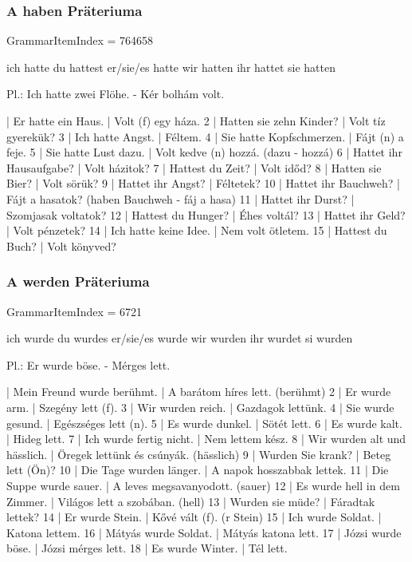 \documentclass{article}
\newenvironment{desc}{\verbatim}{\endverbatim}
\newenvironment{exmp}{\verbatim}{\endverbatim}
\begin{document}
\subsubsection{A haben Präteriuma}

GrammarItemIndex = 764658

\begin{desc}
ich hatte
du hattest
er/sie/es hatte
wir hatten
ihr hattet
sie hatten

Pl.: Ich hatte zwei Flöhe. - Kér bolhám volt.
\end{desc}

\begin{exmp}
1 | Er hatte ein Haus. | Volt (f) egy háza.
2 | Hatten sie zehn Kinder? | Volt tíz gyerekük?
3 | Ich hatte Angst. | Féltem.
4 | Sie hatte Kopfschmerzen. | Fájt (n) a feje.
5 | Sie hatte Lust dazu. | Volt kedve (n) hozzá. (dazu - hozzá)
6 | Hattet ihr Hausaufgabe? | Volt házitok?
7 | Hattest du Zeit? | Volt időd?
8 | Hatten sie Bier? | Volt sörük?
9 | Hattet ihr Angst? | Féltetek?
10 | Hattet ihr Bauchweh? | Fájt a hasatok? (haben Bauchweh - fáj a hasa)
11 | Hattet ihr Durst? | Szomjasak voltatok?
12 | Hattest du Hunger? | Éhes voltál?
13 | Hattet ihr Geld? | Volt pénzetek?
14 | Ich hatte keine Idee. | Nem volt ötletem.
15 | Hattest du Buch? | Volt könyved?
\end{exmp}

\subsubsection{A werden Präteriuma}

GrammarItemIndex = 6721

\begin{desc}
ich wurde
du wurdes
er/sie/es wurde
wir wurden
ihr wurdet
si wurden

Pl.: Er wurde böse. - Mérges lett.
\end{desc}

\begin{exmp}
1 | Mein Freund wurde berühmt. | A barátom híres lett. (berühmt)
2 | Er wurde arm. | Szegény lett (f).
3 | Wir wurden reich. | Gazdagok lettünk.
4 | Sie wurde gesund. | Egészséges lett (n).
5 | Es wurde dunkel. | Sötét lett.
6 | Es wurde kalt. | Hideg lett.
7 | Ich wurde fertig nicht. | Nem lettem kész.
8 | Wir wurden alt und hässlich. | Öregek lettünk és csúnyák. (hässlich)
9 | Wurden Sie krank? | Beteg lett (Ön)?
10 | Die Tage wurden länger. | A napok hosszabbak lettek.
11 | Die Suppe wurde sauer. | A leves megsavanyodott. (sauer)
12 | Es wurde hell in dem Zimmer. | Világos lett a szobában. (hell)
13 | Wurden sie müde? | Fáradtak lettek?
14 | Er wurde Stein. | Kővé vált (f). (r Stein)
15 | Ich wurde Soldat. | Katona lettem.
16 | Mátyás wurde Soldat. | Mátyás katona lett.
17 | Józsi wurde böse. | Józsi mérges lett.
18 | Es wurde Winter. | Tél lett.
\end{exmp}
\end{document}
